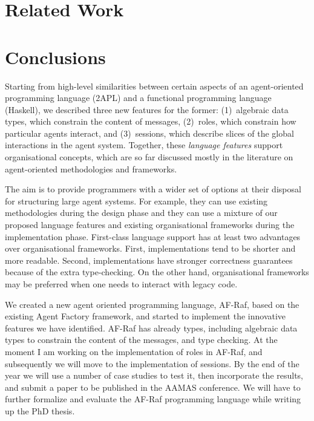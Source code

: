 \documentclass[a4paper,12pt,oneside]{book} %
\theoremstyle{remark}
\theoremstyle{plain}
\newcommand{\rg}[1]{\marginpar{\tiny\raggedright\textcolor{blue}{\bf rg:} #1}}
\begin{document}
\chapter{Related Work} %

\chapter{Conclusions}\label{ch:conc} %

Starting from high-level similarities between certain aspects of an
agent-oriented programming language (2APL) and a functional programming
language (Haskell), we described three new features for the former:
(1)~algebraic data types, which constrain the content of messages,
(2)~roles, which constrain how particular agents interact, and
(3)~sessions, which describe slices of the global interactions in the agent
system. Together, these \emph{language features} support organisational
concepts, which are so far discussed mostly in the literature on
agent-oriented methodologies and frameworks.

The aim is to provide programmers with a wider set of options at their disposal
for structuring large agent systems. For example, they can use existing
methodologies during the design phase and they can use a mixture of our
proposed language features and existing organisational frameworks during the
implementation phase. First-class language support has at least two
advantages over organisational frameworks. First, implementations tend to be
shorter and more readable. Second, implementations have stronger correctness
guarantees because of the extra type-checking. On the other hand,
organisational frameworks may be preferred when one needs to interact with
legacy code.

We created a new agent oriented programming language, AF-Raf, based on the
existing Agent Factory framework, and started to implement the innovative
features we have identified. AF-Raf has already types, including algebraic
data types to constrain the content of the messages, and type checking. At
the moment I am working on the implementation of roles in AF-Raf, and
subsequently we will move to the implementation of sessions. By the end of the
year we will use a number of case studies to test it, then incorporate the
results, and submit a paper to be published in the AAMAS conference. We will
have to further formalize and evaluate the AF-Raf programming language while
writing up the PhD thesis. \rg{This is a bit too self-referential, no?}
\end{document}

